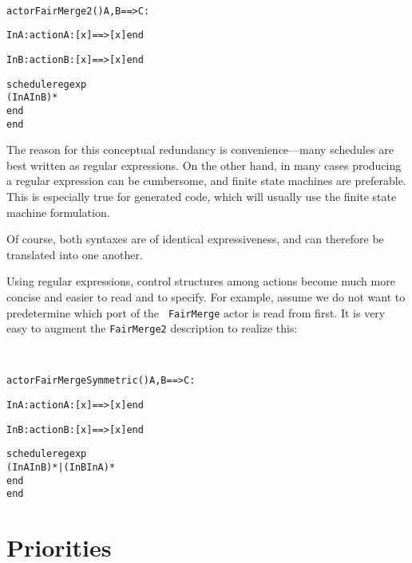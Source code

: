 \begin{example}\ 
\begin{alltt}
actor FairMerge2 () A, B ==> C :

  InA: action A: [x] ==> [x] end

  InB: action B: [x] ==> [x] end

  schedule regexp 
    (InA InB)*
  end
end
\end{alltt}
\end{example}

\begin{rationale}
  The reason for this conceptual redundancy is convenience---many
  schedules are best written as regular expressions. On the other
  hand, in many cases producing a regular expression can be
  cumbersome, and finite state machines are preferable.  This is
  especially true for generated code, which will usually use the
  finite state machine formulation.

  Of course, both syntaxes are of identical expressiveness, and can
  therefore be translated into one another.
\end{rationale}

Using regular expressions, control structures among actions become
much more concise and easier to read and to specify. For example,
assume we do not want to predetermine which port of the {\tt
  FairMerge} actor is read from first. It is very easy to augment the
{\tt FairMerge2} description to realize this:

\pagebreak[4]

\begin{example}\ 
\begin{alltt}
actor FairMergeSymmetric () A, B ==> C :

  InA: action A: [x] ==> [x] end

  InB: action B: [x] ==> [x] end

  schedule regexp 
    (InA InB)* | (InB InA)*
  end
end
\end{alltt}
\end{example}




\section{Priorities}\label{sect:ActionPriorities}

